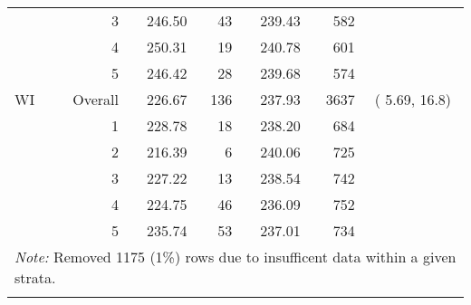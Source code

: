 \begin{longtable}{lrrr@{\extracolsep{.25cm}}rrc}
   & 3 & 246.50 &  43 & 239.43 & 582 &  \\ 
   & 4 & 250.31 &  19 & 240.78 & 601 &  \\ 
   & 5 & 246.42 &  28 & 239.68 & 574 &  \\ 
   \hline
WI & Overall & 226.67 & 136 & 237.93 & 3637 & (  5.69, 16.8) \\ 
   & 1 & 228.78 &  18 & 238.20 & 684 &  \\ 
   & 2 & 216.39 &   6 & 240.06 & 725 &  \\ 
   & 3 & 227.22 &  13 & 238.54 & 742 &  \\ 
   & 4 & 224.75 &  46 & 236.09 & 752 &  \\ 
   & 5 & 235.74 &  53 & 237.01 & 734 &  \\ 
   \hline \multicolumn{7}{l}{\textit{Note:} Removed 1175 (1\%) rows due to insufficent data within a given strata.} \\\hline
\label{g4math-mlpsa-lr}
\end{longtable}
